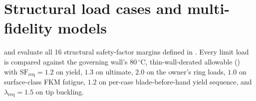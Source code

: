 \section{Structural load cases and multi-fidelity models}\label{sec:loads}
 and  evaluate all 16
structural safety-factor margins defined in . Every limit load is compared against the governing
wall's $80\,^\circ\mathrm{C}$, thin-wall-derated allowable () with
$\mathrm{SF}_\mathrm{req} = 1.2$ on yield, $1.3$ on ultimate, $2.0$ on the owner's ring loads, $1.0$ on surface-class FKM
fatigue, $1.2$ on per-case blade-before-hand yield sequence, and $\lambda_\mathrm{req} = 1.5$ on tip buckling.

